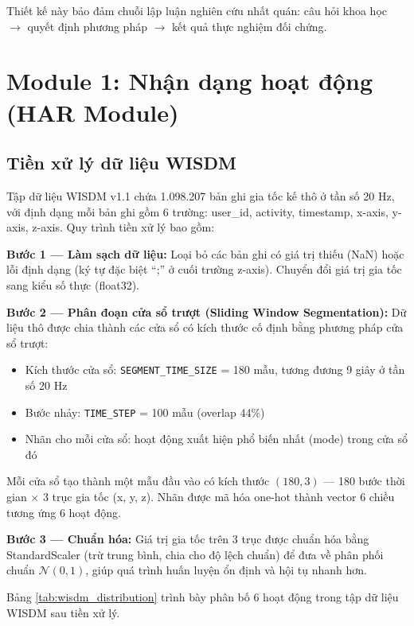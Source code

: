 Thiết kế này bảo đảm chuỗi lập luận nghiên cứu nhất quán: câu hỏi khoa học $\rightarrow$ quyết định phương pháp $\rightarrow$ kết quả thực nghiệm đối chứng.


\section{Module 1: Nhận dạng hoạt động (HAR Module)}
\label{sec:har_module}

\subsection{Tiền xử lý dữ liệu WISDM}
\label{subsec:wisdm_preprocessing}

Tập dữ liệu WISDM v1.1 chứa 1.098.207 bản ghi gia tốc kế thô ở tần số 20 Hz, với định dạng mỗi bản ghi gồm 6 trường: user\_id, activity, timestamp, x-axis, y-axis, z-axis. Quy trình tiền xử lý bao gồm:

\textbf{Bước 1 — Làm sạch dữ liệu:} Loại bỏ các bản ghi có giá trị thiếu (NaN) hoặc lỗi định dạng (ký tự đặc biệt ``;'' ở cuối trường z-axis). Chuyển đổi giá trị gia tốc sang kiểu số thực (float32).

\textbf{Bước 2 — Phân đoạn cửa sổ trượt (Sliding Window Segmentation):} Dữ liệu thô được chia thành các cửa sổ có kích thước cố định bằng phương pháp cửa sổ trượt:
\begin{itemize}
    \item Kích thước cửa sổ: \texttt{SEGMENT\_TIME\_SIZE} = 180 mẫu, tương đương 9 giây ở tần số 20 Hz
    \item Bước nhảy: \texttt{TIME\_STEP} = 100 mẫu (overlap 44\%)
    \item Nhãn cho mỗi cửa sổ: hoạt động xuất hiện phổ biến nhất (mode) trong cửa sổ đó
\end{itemize}

Mỗi cửa sổ tạo thành một mẫu đầu vào có kích thước $(180, 3)$ — 180 bước thời gian $\times$ 3 trục gia tốc (x, y, z). Nhãn được mã hóa one-hot thành vector 6 chiều tương ứng 6 hoạt động.

\textbf{Bước 3 — Chuẩn hóa:} Giá trị gia tốc trên 3 trục được chuẩn hóa bằng StandardScaler (trừ trung bình, chia cho độ lệch chuẩn) để đưa về phân phối chuẩn $\mathcal{N}(0, 1)$, giúp quá trình huấn luyện ổn định và hội tụ nhanh hơn.

Bảng \ref{tab:wisdm_distribution} trình bày phân bố 6 hoạt động trong tập dữ liệu WISDM sau tiền xử lý.

